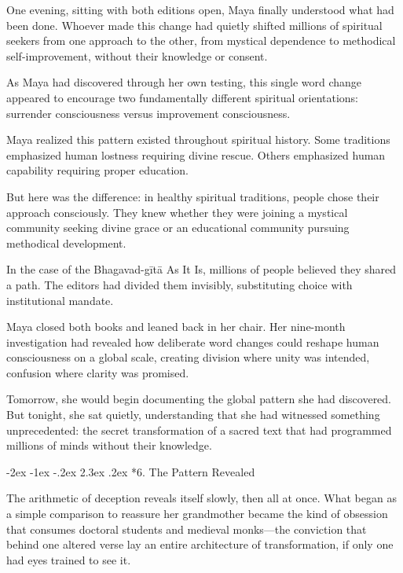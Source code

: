 \documentclass[12pt,twoside]{book}
\makeatletter
\def\cleardoublepage{\clearpage\if@twoside \ifodd\c@page\else\hbox{}\thispagestyle{empty}\newpage\if@twocolumn\hbox{}\newpage\fi\fi\fi}
\renewcommand\section{\@startsection{section}{1}{\z@}%
{-2ex \@plus -1ex \@minus -.2ex}%
{2.3ex \@plus.2ex}%
{\normalfont\Large\bfseries}}
\makeatother
\begin{document}
One evening, sitting with both editions open, Maya finally understood what had been done. Whoever made this change had quietly shifted millions of spiritual seekers from one approach to the other, from mystical dependence to methodical self-improvement, without their knowledge or consent.

As Maya had discovered through her own testing, this single word change appeared to encourage two fundamentally different spiritual orientations: surrender consciousness versus improvement consciousness.

Maya realized this pattern existed throughout spiritual history. Some traditions emphasized human lostness requiring divine rescue. Others emphasized human capability requiring proper education.

But here was the difference: in healthy spiritual traditions, people chose their approach consciously. They knew whether they were joining a mystical community seeking divine grace or an educational community pursuing methodical development.

In the case of the Bhagavad-gītā As It Is, millions of people believed they shared a path. The editors had divided them invisibly, substituting choice with institutional mandate.

Maya closed both books and leaned back in her chair. Her nine-month investigation had revealed how deliberate word changes could reshape human consciousness on a global scale, creating division where unity was intended, confusion where clarity was promised.

Tomorrow, she would begin documenting the global pattern she had discovered. But tonight, she sat quietly, understanding that she had witnessed something unprecedented: the secret transformation of a sacred text that had programmed millions of minds without their knowledge.

\cleardoublepage
\vspace*{0.20\textheight}
\section*{6. The Pattern Revealed}
\thispagestyle{chapterpage}

\normalfont\justifying
The arithmetic of deception reveals itself slowly, then all at once. What began as a simple comparison to reassure her grandmother became the kind of obsession that consumes doctoral students and medieval monks—the conviction that behind one altered verse lay an entire architecture of transformation, if only one had eyes trained to see it.
\end{document}
